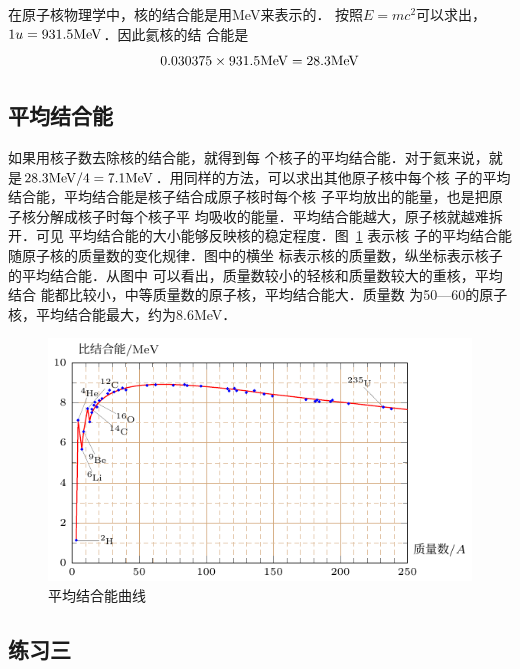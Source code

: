 在原子核物理学中，核的结合能是用MeV来表示的．
按照$E=mc^2$可以求出，$1u=931.5{\rm MeV}$．因此氦核的结
合能是
\[0.030375\times 931.5{\rm MeV}=28.3{\rm MeV}\]

\subsection{平均结合能} 

如果用核子数去除核的结合能，就得到每
个核子的平均结合能．对于氦来说，就是$28.3{\rm MeV}/4=
7.1{\rm MeV}$．用同样的方法，可以求出其他原子核中每个核
子的平均结合能，平均结合能是核子结合成原子核时每个核
子平均放出的能量，也是把原子核分解成核子时每个核子平
均吸收的能量．平均结合能越大，原子核就越难拆开．可见
平均结合能的大小能够反映核的稳定程度．图~\ref{fig_C_9-11} 表示核
子的平均结合能随原子核的质量数的变化规律．图中的横坐
标表示核的质量数，纵坐标表示核子的平均结合能．从图中
可以看出，质量数较小的轻核和质量数较大的重核，平均结合
能都比较小，中等质量数的原子核，平均结合能大．质量数
为50—60的原子核，平均结合能最大，约为8.6MeV．

\begin{figure}[htbp]
    \centering
    \includegraphics{fig/C/9-11.pdf}
    \caption{平均结合能曲线}\label{fig_C_9-11}
\end{figure}


\subsection*{练习三}


